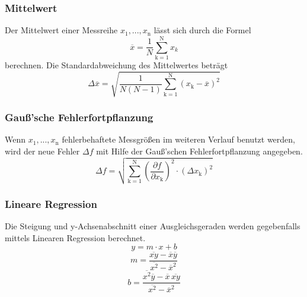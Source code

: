 \subsubsection{Mittelwert}
Der Mittelwert einer Messreihe $x_\text{1}, ... ,x_\text{n}$ lässt sich durch die Formel
\begin{equation}
	\overline{x} = \frac{1}{N} \sum_{\text{k}=1}^\text{N} x_k
	\label{eqn:ave}
\end{equation}
berechnen. Die Standardabweichung des Mittelwertes beträgt
\begin{equation}
	\Delta \overline{x} = \sqrt{ \frac{1}{N(N-1)} \sum_{\text{k}=1}^\text{N} (x_\text{k} - \overline{x})^2}
	\label{eqn:std}
\end{equation}

\subsubsection{Gauß'sche Fehlerfortpflanzung}
Wenn $x_\text{1}, ..., x_\text{n}$ fehlerbehaftete Messgrößen im weiteren Verlauf benutzt werden, wird der neue Fehler $\Delta f$ mit Hilfe der Gauß'schen Fehlerfortpflanzung angegeben.
\begin{equation}
	\Delta f = \sqrt{\sum_{\text{k}=1}^\text{N} \left( \frac{ \partial f}{\partial x_\text{k}} \right) ^2 \cdot (\Delta x_\text{k})^2}
	\label{eqn:var}
\end{equation}

\subsubsection{Lineare Regression}
Die Steigung und y-Achsenabschnitt einer Ausgleichsgeraden werden gegebenfalls mittels Linearen Regression berechnet.
\begin{equation}
	y = m \cdot x + b
	\label{eqn:reg}
\end{equation}
\begin{equation}
	m = \frac{ \overline{xy} - \overline{x} \overline{y} } {\overline{x^2} - \overline{x}^2}
	\label{eqn:reg_m}
\end{equation}
\begin{equation}
	b = \frac{ \overline{x^2}\overline{y} - \overline{x} \, \overline{xy}} { \overline{x^2} - \overline{x}^2}
	\label{eqn:reg_b}
\end{equation}

